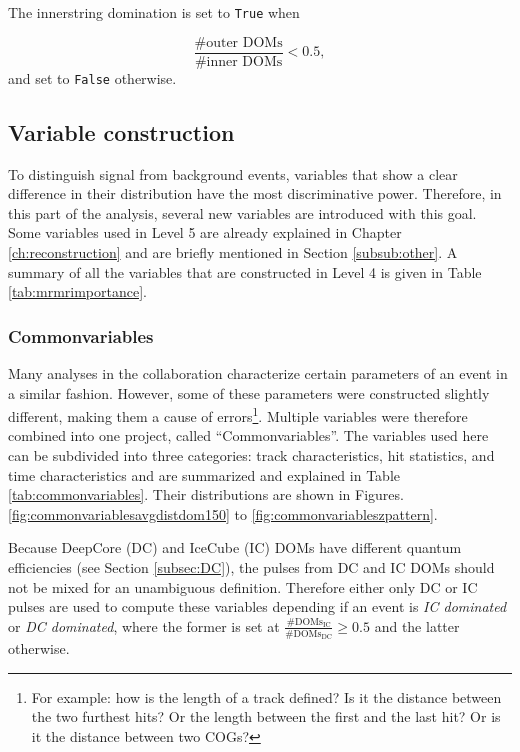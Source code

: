 \noindent The innerstring domination is set to \texttt{True} when 

\begin{equation}
\frac{\# \textrm{outer DOMs}}{\#\textrm{inner DOMs}} < 0.5,
\end{equation}
\noindent and set to \texttt{False} otherwise.

\subsection{Variable construction}
To distinguish signal from background events, variables that show a clear difference in their distribution have the most discriminative power. Therefore, in this part of the analysis, several new variables are introduced with this goal. Some variables used in Level 5 are already explained in Chapter \ref{ch:reconstruction} and are briefly mentioned in Section \ref{subsub:other}. A summary of all the variables that are constructed in Level 4 is given in Table \ref{tab:mrmrimportance}.

\subsubsection{Commonvariables}
\label{subsub:commonvariables}
Many analyses in the collaboration characterize certain parameters of an event in a similar fashion. However, some of these parameters were constructed slightly different, making them a cause of errors\footnote{For example: how is the length of a track defined? Is it the distance between the two furthest hits? Or the length between the first and the last hit? Or is it the distance between two COGs?}. Multiple variables were therefore combined into one project, called ``Commonvariables''. The variables used here can be subdivided into three categories: track characteristics, hit statistics, and time characteristics and are summarized and explained in Table \ref{tab:commonvariables}. Their distributions are shown in Figures. \ref{fig:commonvariablesavgdistdom150} to \ref{fig:commonvariableszpattern}.

Because DeepCore (DC) and IceCube (IC) DOMs have different quantum efficiencies (see Section \ref{subsec:DC}), the pulses from DC and IC DOMs should not be mixed for an unambiguous definition. Therefore either only DC or IC pulses are used to compute these variables depending if an event is \textit{IC dominated} or \textit{DC dominated}, where the former is set at $\frac{\# \textrm{DOMs}_\textrm{IC}}{\# \textrm{DOMs}_\textrm{DC}} \geq 0.5$ and the latter otherwise.\\

